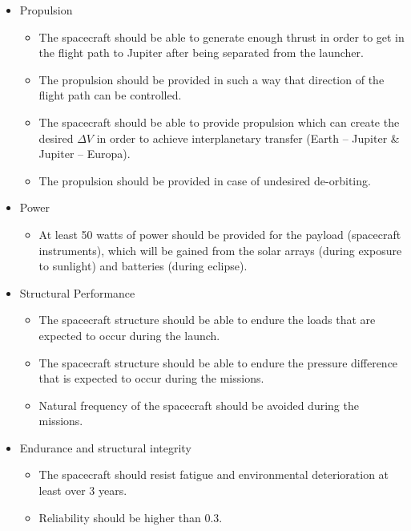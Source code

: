 \begin{itemize}

\item{Propulsion}
  \begin{itemize}
  \item The spacecraft should be able to generate enough thrust in
    order to get in the flight path to Jupiter after being separated
    from the launcher.
  \item The propulsion should be provided in such a way that direction
    of the flight path can be controlled.
  \item The spacecraft should be able to provide propulsion which can
    create the desired $\Delta V$ in order to achieve interplanetary
    transfer (Earth -- Jupiter \& Jupiter -- Europa).
  \item The propulsion should be provided in case of undesired
    de-orbiting.
  \end{itemize}

\item{Power}
  \begin{itemize}
  \item At least 50 watts of power should be provided for the payload
    (spacecraft instruments), which will be gained from the solar
    arrays (during exposure to sunlight) and batteries (during
    eclipse).
  \end{itemize}

\item{Structural Performance}
  \begin{itemize}
  \item The spacecraft structure should be able to endure the loads
    that are expected to occur during the launch.
  \item The spacecraft structure should be able to endure the pressure
    difference that is expected to occur during the missions.
  \item Natural frequency of the spacecraft should be avoided during
    the missions.
  \end{itemize}

\item{Endurance and structural integrity}
  \begin{itemize}
  \item The spacecraft should resist fatigue and environmental
    deterioration at least over 3 years.
  \item Reliability should be higher than 0.3.
  \end{itemize}


\end{itemize}
